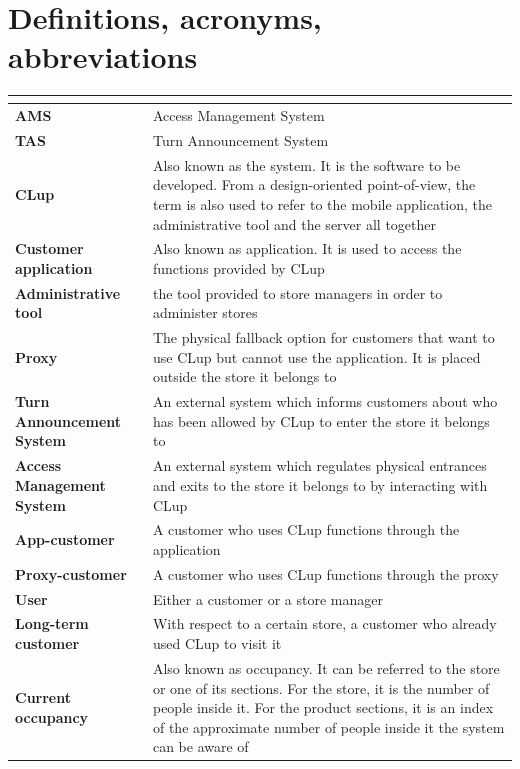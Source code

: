 \documentclass[a4paper,oneside,11pt]{book}
\begin{document}
    \section{Definitions, acronyms, abbreviations}
    \begin{longtable}[c] { |>{\bfseries{}}C{0.25\textwidth}|H{0.55\textwidth}| }
        \hline
         \\
        \hline
        AMS                  & Access Management System \\ \hline
        TAS                  & Turn Announcement System \\ \hline
        CLup                 & Also known as the system. It is the software to be developed. From a design-oriented point-of-view, the term is also used to refer to the mobile application, the administrative tool and the server all together \\ \hline
        Customer application & Also known as application. It is used to access the functions provided by CLup  \\ \hline
        Administrative tool  & the tool provided to store managers in order to administer stores \\ \hline
        Proxy                & The physical fallback option for customers that want to use CLup but cannot use the application. It is placed outside the store it belongs to \\ \hline
        Turn Announcement System & An external system which informs customers about who has been allowed by CLup to enter the store it belongs to \\ \hline
        Access Management System & An external system which regulates physical entrances and exits to the store it belongs to by interacting with CLup \\ \hline
        App-customer & A customer who uses CLup functions through the application \\ \hline
        Proxy-customer & A customer who uses CLup functions through the proxy \\ \hline
        User & Either a customer or a store manager \\ \hline
        Long-term customer & With respect to a certain store, a customer who already used CLup to visit it \\ \hline
        Current occupancy & Also known as occupancy. It can be referred to the store or one of its sections. For the store, it is the number of people inside it. For the product sections, it is an index of the approximate number of people inside it the system can be aware of \\ \hline

\end{longtable}
\end{document}
